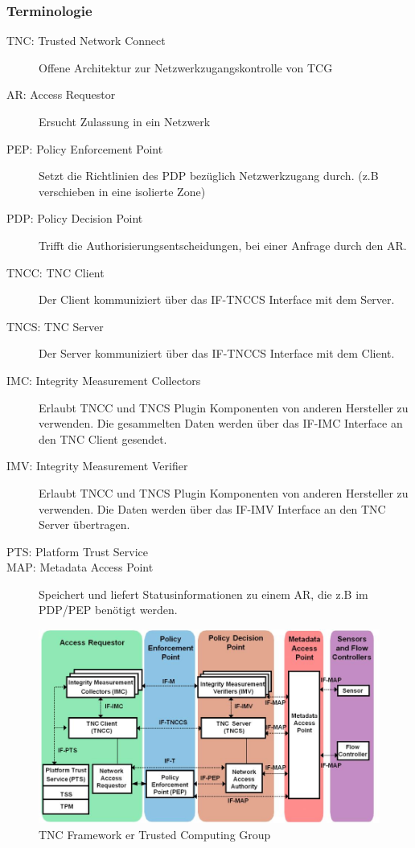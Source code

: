 \subsubsection{Terminologie}
\begin{description}
	\item[TNC: Trusted Network Connect] Offene Architektur zur Netzwerkzugangskontrolle von TCG
	\item[AR: Access Requestor] Ersucht Zulassung in ein Netzwerk
	\item[PEP: Policy Enforcement Point] Setzt die Richtlinien des PDP bezüglich Netzwerkzugang durch. (z.B verschieben in eine isolierte Zone)
	\item[PDP: Policy Decision Point] Trifft die Authorisierungsentscheidungen, bei einer Anfrage durch den AR.
	\item[TNCC: TNC Client] Der Client kommuniziert über das IF-TNCCS Interface mit dem Server.
	\item[TNCS: TNC Server] Der Server kommuniziert über das IF-TNCCS Interface mit dem Client.
	\item[IMC: Integrity Measurement Collectors] Erlaubt TNCC und TNCS Plugin Komponenten von anderen Hersteller zu verwenden. Die gesammelten Daten werden über das IF-IMC Interface an den TNC Client gesendet. 
	\item[IMV: Integrity Measurement Verifier] Erlaubt TNCC und TNCS Plugin Komponenten von anderen Hersteller zu verwenden. Die Daten werden über das IF-IMV Interface an den TNC Server übertragen.
	\item[PTS: Platform Trust Service]
	\item[MAP: Metadata Access Point] Speichert und liefert Statusinformationen zu einem AR, die z.B im PDP/PEP benötigt werden.
\end{description}
\begin{figure}[h]
\centering
\includegraphics[width=\linewidth]{images/tnc_framework}
\caption{TNC Framework er Trusted Computing Group}
\label{fig:tncframework}
\end{figure}

